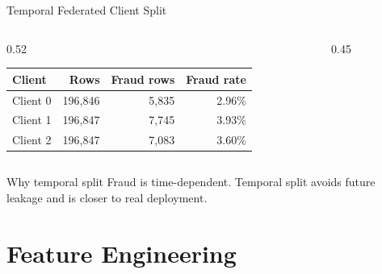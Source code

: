 \documentclass[aspectratio=169,10pt]{beamer}
\begin{document}
\begin{frame}{Temporal Federated Client Split}
  \begin{columns}[T]
    \begin{column}{0.52\textwidth}
      \begin{table}
        \centering
        \begin{tabular}{lrrr}
          \toprule
          Client & Rows & Fraud rows & Fraud rate \\
          \midrule
          Client 0 & 196,846 & 5,835 & 2.96\% \\
          Client 1 & 196,847 & 7,745 & 3.93\% \\
          Client 2 & 196,847 & 7,083 & 3.60\% \\
          \bottomrule
        \end{tabular}
      \end{table}
    \end{column}
    \begin{column}{0.45\textwidth}
    \end{column}
  \end{columns}
  \begin{block}{Why temporal split}
    Fraud is time-dependent. Temporal split avoids future leakage and is closer to real deployment.
  \end{block}
\end{frame}

\section{Feature Engineering}
\end{document}

